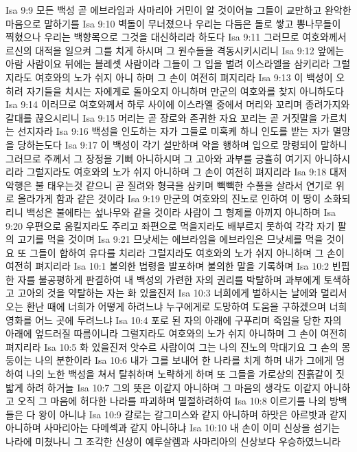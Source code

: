 Isa 9:9  모든 백성 곧 에브라임과 사마리아 거민이 알 것이어늘 그들이 교만하고 완악한 마음으로 말하기를
Isa 9:10  벽돌이 무너졌으나 우리는 다듬은 돌로 쌓고 뽕나무들이 찍혔으나 우리는 백향목으로 그것을 대신하리라 하도다
Isa 9:11  그러므로 여호와께서 르신의 대적을 일으켜 그를 치게 하시며 그 원수들을 격동시키시리니
Isa 9:12  앞에는 아람 사람이요 뒤에는 블레셋 사람이라 그들이 그 입을 벌려 이스라엘을 삼키리라 그럴지라도 여호와의 노가 쉬지 아니 하며 그 손이 여전히 펴지리라
Isa 9:13  이 백성이 오히려 자기들을 치시는 자에게로 돌아오지 아니하며 만군의 여호와를 찾지 아니하도다
Isa 9:14  이러므로 여호와께서 하루 사이에 이스라엘 중에서 머리와 꼬리며 종려가지와 갈대를 끊으시리니
Isa 9:15  머리는 곧 장로와 존귀한 자요 꼬리는 곧 거짓말을 가르치는 선지자라
Isa 9:16  백성을 인도하는 자가 그들로 미혹케 하니 인도를 받는 자가 멸망을 당하는도다
Isa 9:17  이 백성이 각기 설만하며 악을 행하며 입으로 망령되이 말하니 그러므로 주께서 그 장정을 기뻐 아니하시며 그 고아와 과부를 긍휼히 여기지 아니하시리라 그럴지라도 여호와의 노가 쉬지 아니하며 그 손이 여전히 펴지리라
Isa 9:18  대저 악행은 불 태우는것 같으니 곧 질려와 형극을 삼키며 빽빽한 수풀을 살라서 연기로 위로 올라가게 함과 같은 것이라
Isa 9:19  만군의 여호와의 진노로 인하여 이 땅이 소화되리니 백성은 불에타는 섶나무와 같을 것이라 사람이 그 형제를 아끼지 아니하며
Isa 9:20  우편으로 움킬지라도 주리고 좌편으로 먹을지라도 배부르지 못하여 각각 자기 팔의 고기를 먹을 것이며
Isa 9:21  므낫세는 에브라임을 에브라임은 므낫세를 먹을 것이요 또 그들이 합하여 유다를 치리라 그럴지라도 여호와의 노가 쉬지 아니하며 그 손이 여전히 펴지리라
Isa 10:1  불의한 법령을 발포하며 불의한 말을 기록하며
Isa 10:2  빈핍한 자를 불공평하게 판결하여 내 백성의 가련한 자의 권리를 박탈하며 과부에게 토색하고 고아의 것을 약탈하는 자는 화 있을진저
Isa 10:3  너희에게 벌하시는 날에와 멀리서 오는 환난 때에 너희가 어떻게 하려느냐 누구에게로 도망하여 도움을 구하겠으며 너희 영화를 어느 곳에 두려느냐
Isa 10:4  포로 된 자의 아래에 구푸리며 죽임을 당한 자의 아래에 엎드러질 따름이니라 그럴지라도 여호와의 노가 쉬지 아니하며 그 손이 여전히 펴지리라
Isa 10:5  화 있을진저 앗수르 사람이여 그는 나의 진노의 막대기요 그 손의 몽둥이는 나의 분한이라
Isa 10:6  내가 그를 보내어 한 나라를 치게 하며 내가 그에게 명하여 나의 노한 백성을 쳐서 탈취하며 노략하게 하며 또 그들을 가로상의 진흙같이 짓밟게 하려 하거늘
Isa 10:7  그의 뜻은 이같지 아니하며 그 마음의 생각도 이같지 아니하고 오직 그 마음에 허다한 나라를 파괴하며 멸절하려하여
Isa 10:8  이르기를 나의 방백들은 다 왕이 아니냐
Isa 10:9  갈로는 갈그미스와 같지 아니하며 하맛은 아르밧과 같지 아니하며 사마리아는 다메섹과 같지 아니하냐
Isa 10:10  내 손이 이미 신상을 섬기는 나라에 미쳤나니 그 조각한 신상이 예루살렘과 사마리아의 신상보다 우승하였느니라
